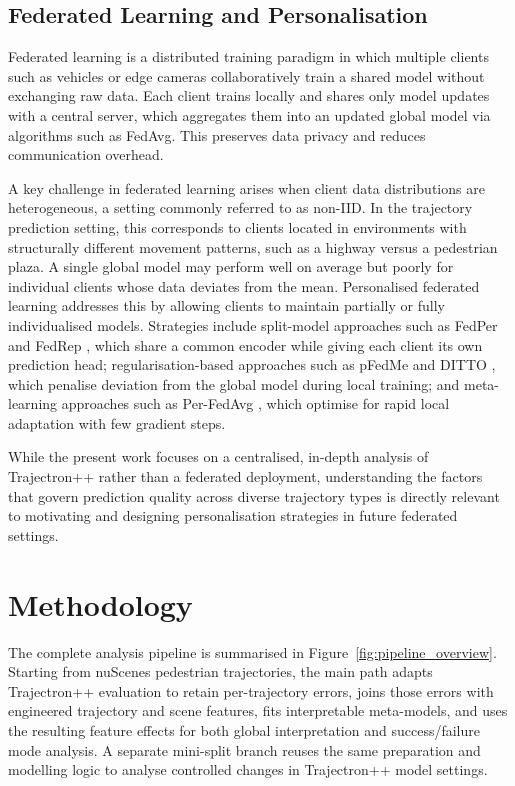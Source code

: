 \documentclass[12pt]{article}
\begin{document}
\subsection{Federated Learning and Personalisation}
\label{sec:federated}
 
Federated learning \citep{mcmahan2017fedavg} is a distributed training paradigm in which multiple clients such as vehicles or edge cameras collaboratively train a shared model without exchanging raw data. Each client trains locally and shares only model updates with a central server, which aggregates them into an updated global model via algorithms such as FedAvg. This preserves data privacy and reduces communication overhead.
 
A key challenge in federated learning arises when client data distributions are heterogeneous, a setting commonly referred to as non-IID. In the trajectory prediction setting, this corresponds to clients located in environments with structurally different movement patterns, such as a highway versus a pedestrian plaza. A single global model may perform well on average but poorly for individual clients whose data deviates from the mean. Personalised federated learning addresses this by allowing clients to maintain partially or fully individualised models. Strategies include split-model approaches such as FedPer and FedRep \citep{arivazhagan2019fedper, collins2021fedRep}, which share a common encoder while giving each client its own prediction head; regularisation-based approaches such as pFedMe \citep{dinh2020pfedme} and DITTO \citep{li2021ditto}, which penalise deviation from the global model during local training; and meta-learning approaches such as Per-FedAvg \citep{fallah2020perfedavg}, which optimise for rapid local adaptation with few gradient steps.
 
While the present work focuses on a centralised, in-depth analysis of Trajectron++ rather than a federated deployment, understanding the factors that govern prediction quality across diverse trajectory types is directly relevant to motivating and designing personalisation strategies in future federated settings.


\clearpage
\section{Methodology}

The complete analysis pipeline is summarised in Figure~\ref{fig:pipeline_overview}. Starting from nuScenes pedestrian trajectories, the main path adapts Trajectron++ evaluation to retain per-trajectory errors, joins those errors with engineered trajectory and scene features, fits interpretable meta-models, and uses the resulting feature effects for both global interpretation and success/failure mode analysis. A separate mini-split branch reuses the same preparation and modelling logic to analyse controlled changes in Trajectron++ model settings.
\end{document}
